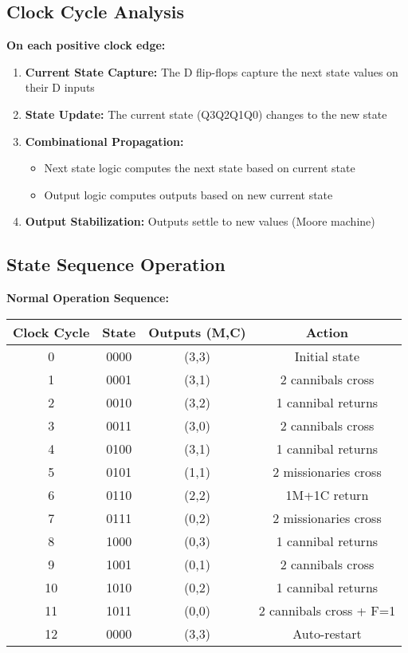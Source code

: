 \documentclass[12pt]{article}
\begin{document}
\subsection{Clock Cycle Analysis}

\textbf{On each positive clock edge:}

\begin{enumerate}
    \item \textbf{Current State Capture:} The D flip-flops capture the next state values on their D inputs
    \item \textbf{State Update:} The current state (Q3Q2Q1Q0) changes to the new state
    \item \textbf{Combinational Propagation:} 
    \begin{itemize}
        \item Next state logic computes the next state based on current state
        \item Output logic computes outputs based on new current state
    \end{itemize}
    \item \textbf{Output Stabilization:} Outputs settle to new values (Moore machine)
\end{enumerate}

\subsection{State Sequence Operation}

\textbf{Normal Operation Sequence:}

\begin{table}[H]
\centering
\begin{tabular}{|c|c|c|c|}
\hline
\textbf{Clock Cycle} & \textbf{State} & \textbf{Outputs (M,C)} & \textbf{Action} \\
\hline
0 & 0000 & (3,3) & Initial state \\
1 & 0001 & (3,1) & 2 cannibals cross \\
2 & 0010 & (3,2) & 1 cannibal returns \\
3 & 0011 & (3,0) & 2 cannibals cross \\
4 & 0100 & (3,1) & 1 cannibal returns \\
5 & 0101 & (1,1) & 2 missionaries cross \\
6 & 0110 & (2,2) & 1M+1C return \\
7 & 0111 & (0,2) & 2 missionaries cross \\
8 & 1000 & (0,3) & 1 cannibal returns \\
9 & 1001 & (0,1) & 2 cannibals cross \\
10 & 1010 & (0,2) & 1 cannibal returns \\
11 & 1011 & (0,0) & 2 cannibals cross + F=1 \\
12 & 0000 & (3,3) & Auto-restart \\
\hline
\end{tabular}
\end{table}
\end{document}
